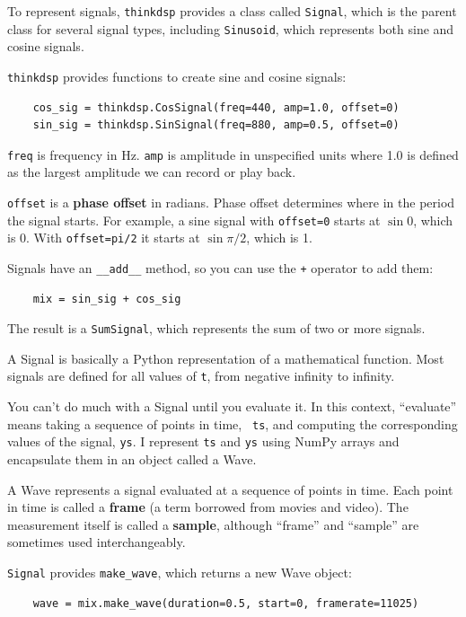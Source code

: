 \documentclass[12pt]{book}
\begin{document}
To represent signals, {\tt thinkdsp} provides a class called
{\tt Signal}, which is the parent class for several signal types,
including {\tt Sinusoid}, which represents both sine and cosine
signals.

{\tt thinkdsp} provides functions to create sine and cosine signals:

\begin{verbatim}
    cos_sig = thinkdsp.CosSignal(freq=440, amp=1.0, offset=0)
    sin_sig = thinkdsp.SinSignal(freq=880, amp=0.5, offset=0)
\end{verbatim}

{\tt freq} is frequency in Hz.  {\tt amp} is amplitude in unspecified
units where 1.0 is defined as the largest amplitude we can record or
play back.

{\tt offset} is a {\bf phase offset} in radians.  Phase offset
determines where in the period the signal starts.  For example, a
sine signal with {\tt offset=0} starts at $\sin 0$, which is 0.
With {\tt offset=pi/2} it starts at $\sin \pi/2$, which is 1.

Signals have an \verb"__add__" method, so you can use the {\tt +}
operator to add them:

\begin{verbatim}
    mix = sin_sig + cos_sig
\end{verbatim}

The result is a {\tt SumSignal}, which represents the sum of two
or more signals.

A Signal is basically a Python representation of a mathematical
function.  Most signals are defined for all values of {\tt t},
from negative infinity to infinity.

You can't do much with a Signal until you evaluate it.  In this
context, ``evaluate'' means taking a sequence of points in time, {\tt
  ts}, and computing the corresponding values of the signal, {\tt ys}.
I represent {\tt ts} and {\tt ys} using NumPy arrays and encapsulate
them in an object called a Wave.

A Wave represents a signal evaluated at a sequence of points in
time.  Each point in time is called a {\bf frame} (a term borrowed
from movies and video).  The measurement itself is called a
{\bf sample}, although ``frame'' and ``sample'' are sometimes
used interchangeably.

{\tt Signal} provides \verb"make_wave", which returns a new
Wave object:

\begin{verbatim}
    wave = mix.make_wave(duration=0.5, start=0, framerate=11025)
\end{verbatim}
\end{document}
